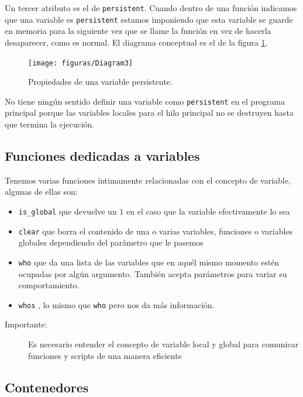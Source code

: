 Un tercer atributo es el de \texttt{persistent}.
Cuando dentro de una función indicamos que una variable es
\texttt{persistent} estamos imponiendo que esta variable se guarde en
memoria para la siguiente vez que se llame la función en vez de
hacerla desaparecer, como es normal. El diagrama conceptual es el de
la figura \ref{cap:Propiedades-de-una}.

%
\begin{figure}[h]
  \centering{}\texttt{[image: figuras/Diagram3]}


  \caption{\label{cap:Propiedades-de-una}Propiedades de una variable
    persistente.}
\end{figure}


No tiene ningún sentido definir una variable como \texttt{persistent}
en el programa principal porque las variables locales para el hilo
principal no se destruyen hasta que termina la ejecución.


\subsection{Funciones dedicadas a variables}

Tenemos varias funciones íntimamente relacionadas con el concepto de
variable, algunas de ellas son:

\begin{itemize}
\item \texttt{is\_global} que devuelve un $1$ en el caso que la
  variable efectivamente lo sea
\item \texttt{clear} que borra el contenido de una o
  varias variables, funciones o variables globales dependiendo del
  parámetro que le pasemos
\item \texttt{who} que da una lista de las variables que en
  aquél mismo momento estén ocupadas por algún argumento. También
  acepta parámetros para variar su comportamiento.
\item \texttt{whos} , lo mismo que \texttt{who} pero nos
  da más información.
\end{itemize}
\begin{description}
\item [Importante:]Es necesario entender el concepto de variable local
  y global para comunicar funciones y scripts de una manera eficiente
\end{description}

\subsection{Contenedores}

